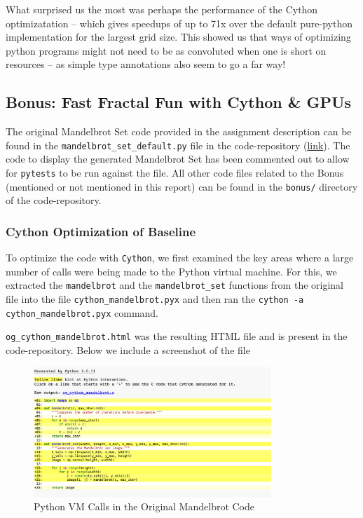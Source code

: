 \documentclass[a4paper,12pt]{article}
\begin{document}
What surprised us the most was perhaps the performance of the Cython optimizatation -- which gives speedups of up to 71x over the default pure-python implementation for the largest grid size. This showed us that ways of optimizing python programs might not need to be as convoluted when one is short on resources -- as simple type annotations also seem to go a far way! 

\subsection{Bonus: Fast Fractal Fun with Cython \& GPUs}
The original Mandelbrot Set code provided in the assignment description can be found in the \verb|mandelbrot_set_default.py| file in the code-repository (\href{https://github.com/paulmyr/DD2358-HPC25/blob/master/03_compgpu/bonus/mandelbrot_set_default.py}{link}). The code to display the generated Mandelbrot Set has been commented out to allow for \verb|pytests| to be run against the file. All other code files related to the Bonus (mentioned or not mentioned in this report) can be found in the \verb|bonus/| directory of the code-repository.

\subsubsection{Cython Optimization of Baseline}
To optimize the code with \verb|Cython|, we first examined the key areas where a large number of calls were being made to the Python virtual machine. For this, we extracted the \verb|mandelbrot| and the \verb|mandelbrot_set| functions from the original file into the file \verb|cython_mandelbrot.pyx| and then ran the \verb|cython -a cython_mandelbrot.pyx| command. 

\verb|og_cython_mandelbrot.html| was the resulting HTML file and is present in the code-repository. Below we include a screenshot of the file

\begin{figure}[H]
  \centering
  \includegraphics[width=0.8\textwidth]{images/og_mandelbrot_cython.png}
  \caption{Python VM Calls in the Original Mandelbrot Code}
\end{figure}
\end{document}

